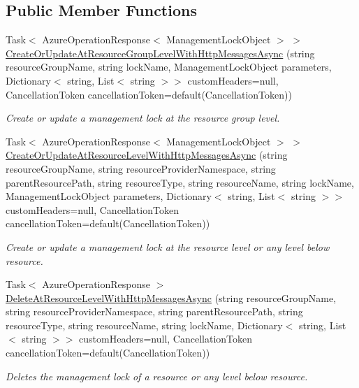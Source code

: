 \subsection*{Public Member Functions}
\begin{DoxyCompactItemize}
\item 
Task$<$ Azure\+Operation\+Response$<$ Management\+Lock\+Object $>$ $>$ \hyperlink{interface_microsoft_1_1_azure_1_1_management_1_1_resources_1_1_i_management_locks_operations_a0416dc292db36776c1b4786d80074b7d}{Create\+Or\+Update\+At\+Resource\+Group\+Level\+With\+Http\+Messages\+Async} (string resource\+Group\+Name, string lock\+Name, Management\+Lock\+Object parameters, Dictionary$<$ string, List$<$ string $>$$>$ custom\+Headers=null, Cancellation\+Token cancellation\+Token=default(Cancellation\+Token))
\begin{DoxyCompactList}\small\item\em Create or update a management lock at the resource group level. \end{DoxyCompactList}\item 
Task$<$ Azure\+Operation\+Response$<$ Management\+Lock\+Object $>$ $>$ \hyperlink{interface_microsoft_1_1_azure_1_1_management_1_1_resources_1_1_i_management_locks_operations_a11677d16f93b691d53113375e49c5abd}{Create\+Or\+Update\+At\+Resource\+Level\+With\+Http\+Messages\+Async} (string resource\+Group\+Name, string resource\+Provider\+Namespace, string parent\+Resource\+Path, string resource\+Type, string resource\+Name, string lock\+Name, Management\+Lock\+Object parameters, Dictionary$<$ string, List$<$ string $>$$>$ custom\+Headers=null, Cancellation\+Token cancellation\+Token=default(Cancellation\+Token))
\begin{DoxyCompactList}\small\item\em Create or update a management lock at the resource level or any level below resource. \end{DoxyCompactList}\item 
Task$<$ Azure\+Operation\+Response $>$ \hyperlink{interface_microsoft_1_1_azure_1_1_management_1_1_resources_1_1_i_management_locks_operations_a1a680da1a4835d38e1b4058c93f949fa}{Delete\+At\+Resource\+Level\+With\+Http\+Messages\+Async} (string resource\+Group\+Name, string resource\+Provider\+Namespace, string parent\+Resource\+Path, string resource\+Type, string resource\+Name, string lock\+Name, Dictionary$<$ string, List$<$ string $>$$>$ custom\+Headers=null, Cancellation\+Token cancellation\+Token=default(Cancellation\+Token))
\begin{DoxyCompactList}\small\item\em Deletes the management lock of a resource or any level below resource. \end{DoxyCompactList}\item 
$$
\end{DoxyCompactItemize}
